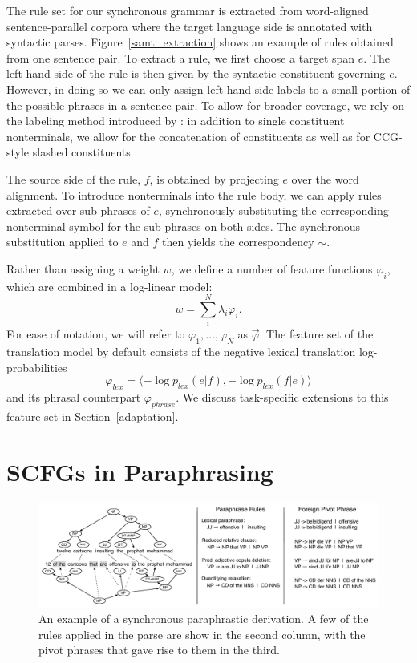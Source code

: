 \documentclass[11pt]{article}
\begin{document}
The rule set for our synchronous grammar is extracted from
word-aligned sentence-parallel corpora where the target language side
is annotated with syntactic parses. Figure~\ref{samt_extraction} shows
an example of rules obtained from one sentence pair. To extract a
rule, we first choose a target span $e$. The left-hand side of the
rule is then given by the syntactic constituent governing
$e$. However, in doing so we can only assign left-hand side labels to
a small portion of the possible phrases in a sentence pair. To allow
for broader coverage, we rely on the labeling method introduced by
: in addition to single constituent
nonterminals, we allow for the concatenation of constituents as well
as for CCG-style slashed constituents \cite{Steedman1999}.

The source side of the rule, $f$, is obtained by projecting $e$ over
the word alignment. To introduce nonterminals into the rule body, we
can apply rules extracted over sub-phrases of $e$, synchronously
substituting the corresponding nonterminal symbol for the sub-phrases
on both sides. The synchronous substitution applied to $e$ and $f$
then yields the correspondency $\sim$.

Rather than assigning a weight $w$, we define a number of feature
functions $\varphi_i$, which are combined in a log-linear model:
\begin{equation}
  w = \sum_i^N \lambda_i \varphi_i .
\end{equation}
For ease of notation, we will refer to $\varphi_1, \ldots ,\varphi_N$
as $\vec{\varphi}$. The feature set of the translation model by
default consists of the negative lexical translation log-probabilities
\[
\varphi_{\mathit{lex}} = \langle -\log p_{\mathit{lex}}(e | f), -\log
p_{\mathit{lex}}(f | e)\rangle
\]
and its phrasal counterpart $\varphi_{\mathit{phrase}}$. We discuss
task-specific extensions to this feature set in
Section~\ref{adaptation}.

\section{SCFGs in Paraphrasing} \label{acquisition}

\begin{figure}[!t]
\begin{center}
\includegraphics[width=0.99\linewidth]{figures/example_compression.pdf}
\end{center}
\caption{An example of a synchronous paraphrastic derivation. A few of
  the rules applied in the parse are show in the second column, with
  the pivot phrases that gave rise to them in the third.}
\end{figure}
\end{document}
